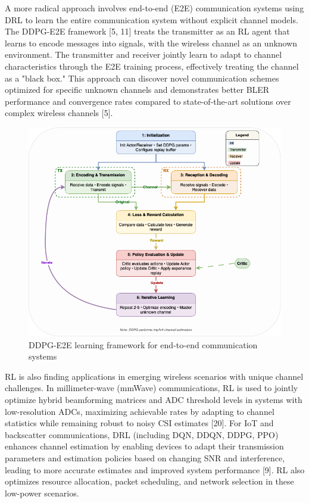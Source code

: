 \documentclass[journal,twocolumn]{IEEEtran}
\begin{document}
A more radical approach involves end-to-end (E2E) communication systems using DRL to learn the entire communication system without explicit channel models. The DDPG-E2E framework [5, 11] treats the transmitter as an RL agent that learns to encode messages into signals, with the wireless channel as an unknown environment. The transmitter and receiver jointly learn to adapt to channel characteristics through the E2E training process, effectively treating the channel as a "black box." This approach can discover novel communication schemes optimized for specific unknown channels and demonstrates better BLER performance and convergence rates compared to state-of-the-art solutions over complex wireless channels [5].

\begin{figure}[!t]
\centering
\includegraphics[width=\columnwidth]{fig_ddpg_e2e.png}
\caption{DDPG-E2E learning framework for end-to-end communication systems}
\label{fig:ddpg_e2e}
\end{figure}

RL is also finding applications in emerging wireless scenarios with unique channel challenges. In millimeter-wave (mmWave) communications, RL is used to jointly optimize hybrid beamforming matrices and ADC threshold levels in systems with low-resolution ADCs, maximizing achievable rates by adapting to channel statistics while remaining robust to noisy CSI estimates [20]. For IoT and backscatter communications, DRL (including DQN, DDQN, DDPG, PPO) enhances channel estimation by enabling devices to adapt their transmission parameters and estimation policies based on changing SNR and interference, leading to more accurate estimates and improved system performance [9]. RL also optimizes resource allocation, packet scheduling, and network selection in these low-power scenarios.
\end{document}
